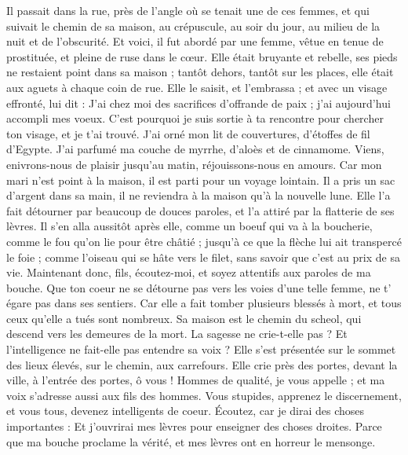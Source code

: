 \begin{multicols}{2}
Il passait dans la rue, près de l'angle où se tenait une de ces femmes, et qui suivait le chemin de sa maison,
au crépuscule, au soir du jour, au milieu de la nuit et de l'obscurité.
Et voici, il fut abordé par une femme, vêtue en tenue de prostituée, et pleine de ruse dans le cœur.
Elle était bruyante et rebelle, ses pieds ne restaient point dans sa maison ;
tantôt dehors, tantôt sur les places, elle était aux aguets à chaque coin de rue.
Elle le saisit, et l'embrassa ; et avec un visage effronté, lui dit :
J'ai chez moi des sacrifices d'offrande de paix ; j'ai aujourd'hui accompli mes voeux.
C'est pourquoi je suis sortie à ta rencontre pour chercher ton visage, et je t'ai trouvé.
J'ai orné mon lit de couvertures, d'étoffes de fil d'Egypte.
J'ai parfumé ma couche de myrrhe, d'aloès et de cinnamome.
Viens, enivrons-nous de plaisir jusqu'au matin, réjouissons-nous en amours.
Car mon mari n'est point à la maison, il est parti pour un voyage lointain.
Il a pris un sac d'argent dans sa main, il ne reviendra à la maison qu'à la nouvelle lune.
Elle l'a fait détourner par beaucoup de douces paroles, et l'a attiré par la flatterie de ses lèvres.
Il s'en alla aussitôt après elle, comme un boeuf qui va à la boucherie, comme le fou qu'on lie pour être châtié ;
jusqu'à ce que la flèche lui ait transpercé le foie ; comme l'oiseau qui se hâte vers le filet, sans savoir que c'est au prix de sa vie.
Maintenant donc, fils, écoutez-moi, et soyez attentifs aux paroles de ma bouche.
Que ton coeur ne se détourne pas vers les voies d'une telle femme, ne t' égare pas dans ses sentiers.
Car elle a fait tomber plusieurs blessés à mort, et tous ceux qu'elle a tués sont nombreux.
Sa maison est le chemin du scheol, qui descend vers les demeures de la mort.
\VerseOne{}La sagesse ne crie-t-elle pas ? Et l'intelligence ne fait-elle pas entendre sa voix ?
Elle s'est présentée sur le sommet des lieux élevés, sur le chemin, aux carrefours.
Elle crie près des portes, devant la ville, à l'entrée des portes,
ô vous ! Hommes de qualité, je vous appelle ; et ma voix s'adresse aussi aux fils des hommes.
Vous stupides, apprenez le discernement, et vous tous, devenez intelligents de coeur.
Écoutez, car je dirai des choses importantes : Et j'ouvrirai mes lèvres pour enseigner des choses droites.
Parce que ma bouche proclame la vérité, et mes lèvres ont en horreur le mensonge.

\end{multicols}
